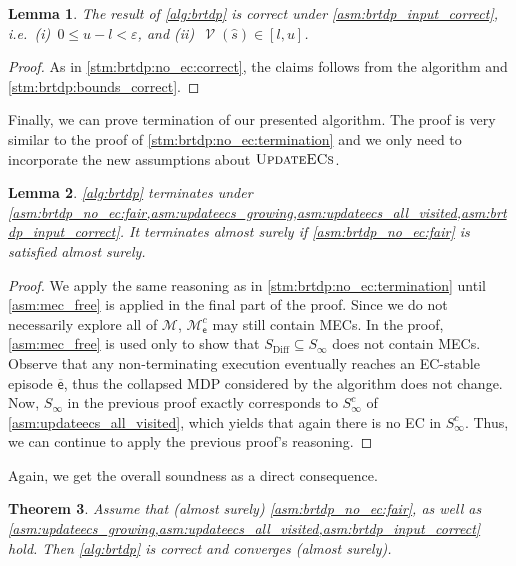 \documentclass{article}
\newtheorem{theorem}{Theorem}\newtheorem{lemma}[theorem]{Lemma}\newtheorem{proposition}[theorem]{Proposition}\newtheorem{corollary}[theorem]{Corollary}\newtheorem{definition}[theorem]{Definition}\newtheorem{claim}[theorem]{Claim}\newtheorem{remark}[theorem]{Remark}\newtheorem{observation}[theorem]{Observation}\newtheorem{conjecture}[theorem]{Conjecture}\newtheorem{example}[theorem]{Example}
\newcommand{\MDP}{\mathcal{M}}
\newcommand{\States}{S}
\newcommand{\initialstate}{\hat{s}}
\DeclareMathOperator{\val}{\mathcal{V}}
\newcommand{\bounddifference}{\mathrm{Diff}}
\newcommand{\updateecs}{\textsc{UpdateECs}}
\newcommand{\algoepisode}{\mathsf{e}}
\begin{document}
\begin{lemma} \label{stm:brtdp:correct}
	The result of \cref{alg:brtdp} is correct under \cref{asm:brtdp_input_correct}, i.e.\ (i)~$0 \leq u - l < \varepsilon$, and (ii)~$\val(\initialstate) \in [l, u]$.
\end{lemma}

\begin{proof}
	As in \cref{stm:brtdp:no_ec:correct}, the claims follows from the algorithm and \cref{stm:brtdp:bounds_correct}. 
\end{proof}

Finally, we can prove termination of our presented algorithm.
The proof is very similar to the proof of \cref{stm:brtdp:no_ec:termination} and we only need to incorporate the new assumptions about $\updateecs$.

\begin{lemma} \label{stm:brtdp:terminates}
	\cref{alg:brtdp} terminates under \cref{asm:brtdp_no_ec:fair,asm:updateecs_growing,asm:updateecs_all_visited,asm:brtdp_input_correct}.
	It terminates almost surely if \cref{asm:brtdp_no_ec:fair} is satisfied almost surely.
\end{lemma}

\begin{proof}
	We apply the same reasoning as in \cref{stm:brtdp:no_ec:termination} until \cref{asm:mec_free} is applied in the final part of the proof.
	Since we do not necessarily explore all of $\MDP$, $\MDP^c_\algoepisode$ may still contain MECs.
	In the proof, \cref{asm:mec_free} is used only to show that $\States_\bounddifference \subseteq \States_\infty$ does not contain MECs.
	Observe that any non-terminating execution eventually reaches an EC-stable episode $\overline{\algoepisode}$, thus the collapsed MDP considered by the algorithm does not change.
	Now, $\States_\infty$ in the previous proof exactly corresponds to $\States_\infty^c$ of \cref{asm:updateecs_all_visited}, which yields that again there is no EC in $\States_\infty^c$.
	Thus, we can continue to apply the previous proof's reasoning. 
\end{proof}
Again, we get the overall soundness as a direct consequence.

\begin{theorem}
	Assume that (almost surely) \cref{asm:brtdp_no_ec:fair}, as well as \cref{asm:updateecs_growing,asm:updateecs_all_visited,asm:brtdp_input_correct} hold.
	Then \cref{alg:brtdp} is correct and converges (almost surely).
\end{theorem}
\end{document}

